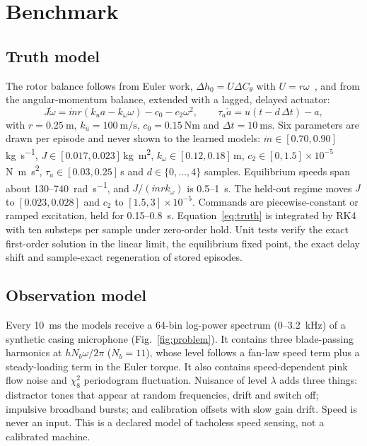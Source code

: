 \documentclass[10pt,journal]{IEEEtran}
\begin{document}
\section{Benchmark}\label{sec:bench}
\subsection{Truth model}
The rotor balance follows from Euler work, $\Delta h_0=U\Delta C_\theta$ with $U=r\omega$~\cite{sforza2017turbomachinery}, and from the angular-momentum balance, extended with a lagged, delayed actuator:
\begin{equation}
J\dot\omega=\dot m r(k_u a-k_\omega\omega)-c_0-c_2\omega^2,\qquad \tau_a\dot a=u(t-d\,\Delta t)-a,
\label{eq:truth}
\end{equation}
with $r=\SI{0.25}{\metre}$, $k_u=\SI{100}{\metre\per\second}$, $c_0=\SI{0.15}{\newton\metre}$ and $\Delta t=\SI{10}{\milli\second}$. Six parameters are drawn per episode and never shown to the learned models: $\dot m\in[0.70,0.90]$\,\si{\kilogram\per\second}, $J\in[0.017,0.023]$\,\si{\kilogram\metre\squared}, $k_\omega\in[0.12,0.18]$\,\si{\metre}, $c_2\in[0,1.5]\times10^{-5}$\,\si{\newton\metre\second\squared}, $\tau_a\in[0.03,0.25]$\,\si{\second} and $d\in\{0,\dots,4\}$ samples. Equilibrium speeds span about 130--\SI{740}{\radian\per\second}, and $J/(\dot m r k_\omega)$ is 0.5--\SI{1}{\second}. The held-out regime moves $J$ to $[0.023,0.028]$ and $c_2$ to $[1.5,3]\times10^{-5}$. Commands are piecewise-constant or ramped excitation, held for 0.15--\SI{0.8}{\second}. Equation~\eqref{eq:truth} is integrated by RK4 with ten substeps per sample under zero-order hold. Unit tests verify the exact first-order solution in the linear limit, the equilibrium fixed point, the exact delay shift and sample-exact regeneration of stored episodes.

\subsection{Observation model}
Every \SI{10}{\milli\second} the models receive a 64-bin log-power spectrum (0--\SI{3.2}{\kilo\hertz}) of a synthetic casing microphone (Fig.~\ref{fig:problem}). It contains three blade-passing harmonics at $hN_b\omega/2\pi$ ($N_b=11$), whose level follows a fan-law speed term plus a steady-loading term in the Euler torque. It also contains speed-dependent pink flow noise and $\chi^2_8$ periodogram fluctuation. Nuisance of level $\lambda$ adds three things: distractor tones that appear at random frequencies, drift and switch off; impulsive broadband bursts; and calibration offsets with slow gain drift. Speed is never an input. This is a declared model of tacholess speed sensing, not a calibrated machine.
\end{document}
